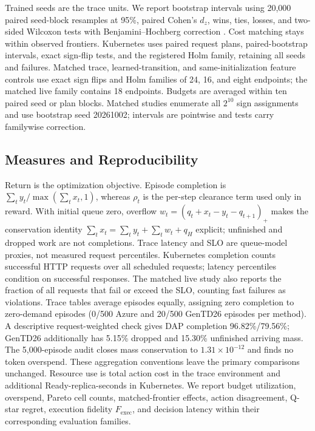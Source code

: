\documentclass[acmsmall,screen,review,anonymous]{acmart}
\begin{document}
Trained seeds are the trace units. We report bootstrap intervals
\cite{agarwal2021precipice} using 20,000 paired seed-block resamples at 95\%,
paired Cohen's \(d_z\), wins, ties, losses, and two-sided Wilcoxon tests
\cite{arcuri2011statistics} with Benjamini--Hochberg correction
\cite{benjamini1995fdr}. Cost matching stays within observed frontiers.
Kubernetes uses paired request plans,
paired-bootstrap intervals, exact sign-flip tests, and the registered Holm
family, retaining all seeds and failures. Matched trace, learned-transition,
and same-initialization feature controls use exact sign flips and Holm families of
24, 16, and eight endpoints; the matched live family contains 18 endpoints.
Budgets are averaged within ten paired seed or plan blocks. Matched studies
enumerate all $2^{10}$ sign assignments and use bootstrap seed 20261002;
intervals are pointwise and tests carry familywise correction.

\subsection{Measures and Reproducibility}

Return is the optimization objective. Episode completion is
\(\sum_t y_t/\max(\sum_t x_t,1)\), whereas \(\rho_t\) is the per-step
clearance term used only in reward. With initial queue zero, overflow
\(w_t=(q_t+x_t-y_t-q_{t+1})_+\) makes the conservation identity
\(\sum_t x_t=\sum_t y_t+\sum_t w_t+q_H\) explicit; unfinished and dropped
work are not completions. Trace latency and SLO are queue-model proxies,
not measured request percentiles. Kubernetes completion counts successful
HTTP requests over all scheduled requests; latency percentiles condition on
successful responses. The matched live study also reports the fraction
of all requests that fail or exceed the SLO, counting fast failures as violations.
Trace tables average episodes equally, assigning zero completion to zero-demand
episodes (0/500 Azure and 20/500 GenTD26 episodes per method). A descriptive
request-weighted check gives DAP completion 96.82\%/79.56\%; GenTD26 additionally
has 5.15\% dropped and 15.30\% unfinished arriving mass. The 5,000-episode
audit closes mass conservation to \(1.31\times10^{-12}\) and finds no token
overspend. These aggregation conventions leave the primary comparisons unchanged.
Resource
use is total action cost in the trace environment and
additional Ready-replica-seconds in Kubernetes.  We report budget utilization,
overspend, Pareto cell counts, matched-frontier effects, action disagreement,
Q-star regret, execution fidelity \(F_{\mathrm{exec}}\), and decision latency
within their corresponding evaluation families.
\end{document}
